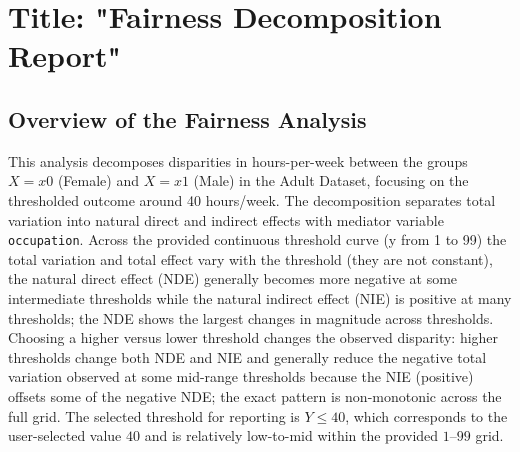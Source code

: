 \documentclass{article}
\begin{document}
\section*{Title: "Fairness Decomposition Report"}

\subsection*{Overview of the Fairness Analysis}
This analysis decomposes disparities in hours-per-week between the groups $X=x0$ (Female) and $X=x1$ (Male) in the Adult Dataset, focusing on the thresholded outcome around 40 hours/week. The decomposition separates total variation into natural direct and indirect effects with mediator variable \texttt{occupation}. Across the provided continuous threshold curve (y from 1 to 99) the total variation and total effect vary with the threshold (they are not constant), the natural direct effect (NDE) generally becomes more negative at some intermediate thresholds while the natural indirect effect (NIE) is positive at many thresholds; the NDE shows the largest changes in magnitude across thresholds. Choosing a higher versus lower threshold changes the observed disparity: higher thresholds change both NDE and NIE and generally reduce the negative total variation observed at some mid-range thresholds because the NIE (positive) offsets some of the negative NDE; the exact pattern is non-monotonic across the full grid. The selected threshold for reporting is $Y \leq 40$, which corresponds to the user-selected value $40$ and is relatively low-to-mid within the provided $1$--$99$ grid.
\end{document}
